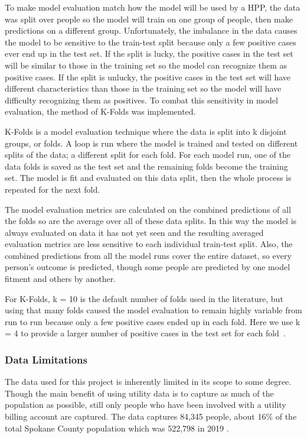 \documentclass[10pt,letterpaper]{article}
\begin{document}
To make model evaluation match how the model will be used by a HPP, the data was split over people so the model will train on one group of people, then make predictions on a different group. Unfortunately, the imbalance in the data causes the model to be sensitive to the train-test split because only a few positive cases ever end up in the test set. If the split is lucky, the positive cases in the test set will be similar to those in the training set so the model can recognize them as positive cases. If the split is unlucky, the positive cases in the test set will have different characteristics than those in the training set so the model will have difficulty recognizing them as positives. To combat this sensitivity in model evaluation, the method of K-Folds was implemented.

K-Folds is a model evaluation technique where the data is split into k disjoint groups, or folds. A loop is run where the model is trained and tested on different splits of the data; a different split for each fold. For each model run, one of the data folds is saved as the test set and the remaining folds become the training set. The model is fit and evaluated on this data split, then the whole process is repeated for the next fold.

The model evaluation metrics are calculated on the combined predictions of all the folds so are the average over all of these data splits. In this way the model is always evaluated on data it has not yet seen and the resulting averaged evaluation metrics are less sensitive to each individual train-test split. Also, the combined predictions from all the model runs cover the entire dataset, so every person's outcome is predicted, though some people are predicted by one model fitment and others by another.

For K-Folds, k = 10 is the default number of folds used in the literature, but using that many folds caused the model evaluation to remain highly variable from run to run because only a few positive cases ended up in each fold. Here we use  k = 4 to provide a larger number of positive cases in the test set for each fold~\cite{marcot2020optimal}.

\subsubsection*{Data Limitations}
The data used for this project is inherently limited in its scope to some degree. Though the main benefit of using utility data is to capture as much of the population as possible, still only people who have been involved with a utility billing account are captured. The data captures 84,345 people, about 16\% of the total Spokane County population which was 522,798 in 2019 \cite{SpokanePop}.
\end{document}
